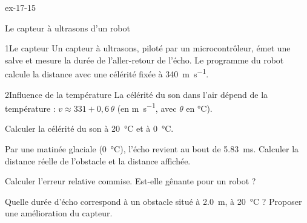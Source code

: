 \begin{blocLivre}{ex-17-15}
\begin{exercice}[3]{Le capteur à ultrasons d'un robot}
\begin{docu}{1}{Le capteur}
Un capteur à ultrasons, piloté par un microcontrôleur, émet une salve et mesure la durée de l'aller-retour de l'écho. Le programme
du robot calcule la distance avec une célérité fixée à \qty{340}{m.s^{-1}}.
\end{docu}
\begin{docu}{2}{Influence de la température}
La célérité du son dans l'air dépend de la température : $v\approx331+0{,}6\,\theta$ (en \unit{m.s^{-1}}, avec $\theta$ en \unit{\degreeCelsius}).
\end{docu}
\begin{questions}
\item Calculer la célérité du son à \qty{20}{\degreeCelsius} et à \qty{0}{\degreeCelsius}.
\item Par une matinée glaciale (\qty{0}{\degreeCelsius}), l'écho revient au bout de \qty{5,83}{ms}. Calculer la distance réelle de l'obstacle et la distance affichée.
\item Calculer l'erreur relative commise. Est-elle gênante pour un robot ?
\item \initiative Quelle durée d'écho correspond à un obstacle situé à \qty{2,0}{m}, à \qty{20}{\degreeCelsius} ? Proposer une amélioration du capteur.
\end{questions}
\end{exercice}
\end{blocLivre}
